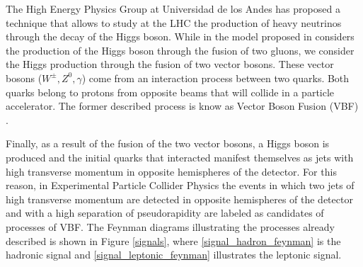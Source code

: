 The High Energy Physics Group at Universidad de los Andes has proposed a technique that allows to study at the LHC the production of heavy neutrinos through the decay of the Higgs boson. While in the model proposed in \cite{Seesaw Mechanism with displace vertices} considers the production of the Higgs boson through the fusion of two gluons, we consider the Higgs production through the fusion of two vector bosons. These vector bosons ($W^{\pm},Z^0,\gamma$) come from an interaction process between two quarks. Both quarks belong to protons from opposite beams that will collide in a particle accelerator. The former described process is know as Vector Boson Fusion (VBF) \cite{VBF processes}. 

Finally, as a result of the fusion of the two vector bosons, a Higgs boson is produced and the initial quarks that interacted manifest themselves as jets with high transverse momentum in opposite
hemispheres of the detector. For this reason, in Experimental Particle Collider Physics the events in which two jets of high transverse momentum are detected in opposite hemispheres of the detector 
and with a high separation of pseudorapidity are labeled as candidates of processes of VBF. The Feynman diagrams illustrating the processes already described is shown in Figure \ref{signals}, where \ref{signal_hadron_feynman} is the hadronic signal and \ref{signal_leptonic_feynman} illustrates the leptonic signal.


